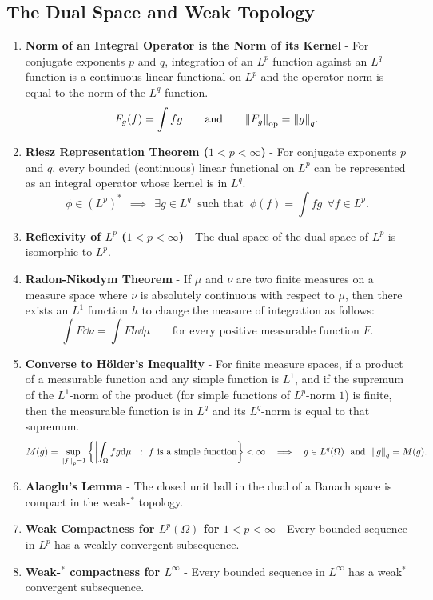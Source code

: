 \documentclass{article}
\begin{document}
    \subsection{The Dual Space and Weak Topology}
    \begin{enumerate}
        \item \textbf{Norm of an Integral Operator is the Norm of its Kernel} - For conjugate exponents $p$ and $q$, integration of an $L^p$ function against an $L^q$ function is a continuous linear functional on $L^p$ and the operator norm is equal to the norm of the $L^q$ function.  $$F_g(f) = \int fg \qquad \text{and} \qquad \norm{F_g}_\text{op} = \norm{g}_q.$$
        \item \textbf{Riesz Representation Theorem ($1 < p < \infty$)} - For conjugate exponents $p$ and $q$, every bounded (continuous) linear functional on $L^p$ can be represented as an integral operator whose kernel is in $L^q$.  $$\phi \in (L^p)^*\ \ \implies\ \ \exists g \in L^q\ \text{ such that }\ \phi(f) = \int f g\ \ \forall f \in L^p.$$
        \item \textbf{Reflexivity of $L^p$ ($1 < p < \infty$)} - The dual space of the dual space of $L^p$ is isomorphic to $L^p$.
        \item \textbf{Radon-Nikodym Theorem} - If $\mu$ and $\nu$ are two finite measures on a measure space where $\nu$ is absolutely continuous with respect to $\mu$, then there exists an $L^1$ function $h$ to change the measure of integration as follows: $$\int F \dd\nu = \int F h \dd\mu \qquad \text{for every positive measurable function } F.$$
        \item \textbf{Converse to H\"{o}lder's Inequality} - For finite measure spaces, if a product of a measurable function and any simple function is $L^1$, and if the supremum of the $L^1$-norm of the product (for simple functions of $L^p$-norm $1$) is finite, then the measurable function is in $L^q$ and its $L^q$-norm is equal to that supremum.  $$M(g) = \sup_{\norm{f}_p = 1} \left\{\abs{\int_\Omega fg \dd\mu}\ :\ f \text{ is a simple function}\right\} < \infty\ \ \implies\ \ g \in L^q(\Omega)\ \ \text{and}\ \ \norm{g}_q = M(g).$$
        \item \textbf{Alaoglu's Lemma} - The closed unit ball in the dual of a Banach space is compact in the weak-$^*$ topology.
        \item \textbf{Weak Compactness for $L^p(\Omega)$ for $1 < p < \infty$} - Every bounded sequence in $L^p$ has a weakly convergent subsequence.
        \item \textbf{Weak-$^*$ compactness for $L^\infty$} - Every bounded sequence in $L^\infty$ has a weak$^*$ convergent subsequence.

\end{enumerate}
\end{document}
